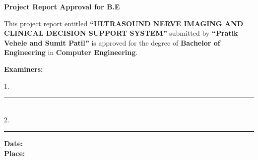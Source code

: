 \documentclass[12pt]{article}
\begin{document}
  

\begin{center}     
    {\Large \textbf{Project Report Approval for B.E}} 
\end{center}  

\vspace{0.5cm}  

\justifying  

This project report entitled \textbf{“ULTRASOUND NERVE IMAGING AND CLINICAL DECISION SUPPORT SYSTEM”}  
submitted by \textbf{“Pratik Vehele and Sumit Patil”} is approved for the degree of  
\textbf{Bachelor of Engineering} in \textbf{Computer Engineering}.  

\vspace{2cm}   

 \hspace{235pt} \textbf{Examiners:}  

\begin{flushright} 
1.\ \rule{7cm}{0.4pt} \vspace{2em} \\
2.\ \rule{7cm}{0.4pt} 
\end{flushright}  

\vfill   

\noindent \textbf{Date:} \\[2em] 
\textbf{Place:}  
\end{document}
